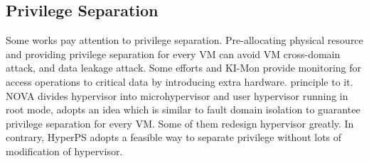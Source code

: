 \documentclass[conference]{IEEEtran}
\begin{document}

\subsection{Privilege Separation}
Some works\cite{nexen,Steinberg2010NOVA,hyperlock,dehy} pay attention to privilege separation. Pre-allocating physical resource and providing privilege separation for every VM can avoid VM cross-domain attack, and data leakage attack. Some efforts\cite{Moon2012Vigilare} and KI-Mon \cite{Lee2013KI} provide monitoring for access operations to critical data by introducing extra hardware.
principle to it.
 NOVA\cite{Steinberg2010NOVA} divides hypervisor into microhypervisor and user hypervisor running in root mode, adopts an idea which is similar to fault domain isolation to guarantee privilege separation for every VM. Some of them redesign hypervisor greatly. In contrary, HyperPS adopts a feasible way to separate privilege without lots of modification of hypervisor. 
\end{document}
